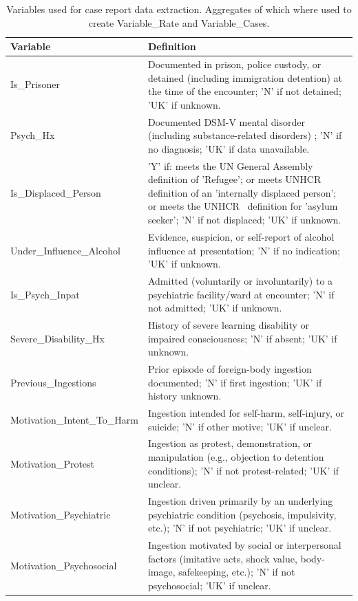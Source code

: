 \begin{appendices}
\begin{table}[h]
\caption{Variables used for case report data extraction. Aggregates of which where used to create Variable\_Rate and Variable\_Cases.}
\label{tab:variables_table}
\centering
\begin{tabular}{p{4cm} p{11cm}}
\toprule
\textbf{Variable} & \textbf{Definition} \\
\midrule
Is\_Prisoner & Documented in prison, police custody, or detained (including immigration detention) at the time of the encounter; 'N' if not detained; 'UK' if unknown. \\
Psych\_Hx & Documented DSM-V mental disorder (including substance-related disorders) \cite{AmericanPsychiatricAssociation_2013}; 'N' if no diagnosis; 'UK' if data unavailable. \\
Is\_Displaced\_Person & 'Y' if: meets the UN General Assembly \cite{UNGeneralAssembly_1967} definition of 'Refugee'; or meets UNHCR~\cite{Deng_1998} definition of an 'internally displaced person'; or meets the UNHCR~\cite{UnitedNationsHighCommissionerforRefugees_2025} definition for 'asylum seeker'; 'N' if not displaced; 'UK' if unknown. \\
Under\_Influence\_Alcohol & Evidence, suspicion, or self-report of alcohol influence at presentation; 'N' if no indication; 'UK' if unknown. \\
Is\_Psych\_Inpat & Admitted (voluntarily or involuntarily) to a psychiatric facility/ward at encounter; 'N' if not admitted; 'UK' if unknown. \\
Severe\_Disability\_Hx & History of severe learning disability or impaired consciousness; 'N' if absent; 'UK' if unknown. \\
Previous\_Ingestions & Prior episode of foreign-body ingestion documented; 'N' if first ingestion; 'UK' if history unknown. \\
Motivation\_Intent\_To\_Harm & Ingestion intended for self-harm, self-injury, or suicide; 'N' if other motive; 'UK' if unclear. \\
Motivation\_Protest & Ingestion as protest, demonstration, or manipulation (e.g., objection to detention conditions); 'N' if not protest-related; 'UK' if unclear. \\
Motivation\_Psychiatric & Ingestion driven primarily by an underlying psychiatric condition (psychosis, impulsivity, etc.); 'N' if not psychiatric; 'UK' if unclear. \\
Motivation\_Psychosocial & Ingestion motivated by social or interpersonal factors (imitative acts, shock value, body-image, safekeeping, etc.); 'N' if not psychosocial; 'UK' if unclear. \\

\end{tabular}
\end{table}
\end{appendices}
